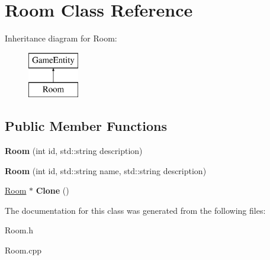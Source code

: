 \hypertarget{class_room}{}\section{Room Class Reference}
\label{class_room}
Inheritance diagram for Room\+:\begin{figure}[H]
\begin{center}
\leavevmode
\includegraphics[height=2.000000cm]{class_room}
\end{center}
\end{figure}
\subsection*{Public Member Functions}
\begin{DoxyCompactItemize}
\item 
\hypertarget{class_room_a7e42f2ddca1d0fde48feabbf4eb06a80}{}{\bfseries Room} (int id, std\+::string description)\label{class_room_a7e42f2ddca1d0fde48feabbf4eb06a80}

\item 
\hypertarget{class_room_a2286569deae9af3cafc5716ce72dcbf1}{}{\bfseries Room} (int id, std\+::string name, std\+::string description)\label{class_room_a2286569deae9af3cafc5716ce72dcbf1}

\item 
\hypertarget{class_room_a15e3463eb05ec8de060d67fb11f6688d}{}\hyperlink{class_room}{Room} $\ast$ {\bfseries Clone} ()\label{class_room_a15e3463eb05ec8de060d67fb11f6688d}

\end{DoxyCompactItemize}


The documentation for this class was generated from the following files\+:\begin{DoxyCompactItemize}
\item 
Room.\+h\item 
Room.\+cpp\end{DoxyCompactItemize}
